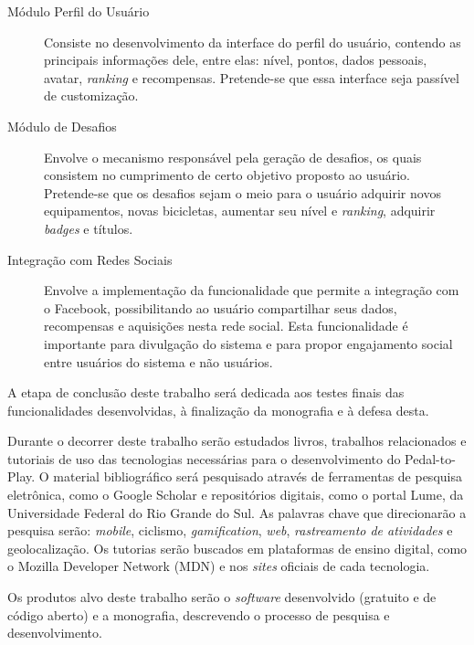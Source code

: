 \begin{description}
\item[Módulo Perfil do Usuário] Consiste no desenvolvimento da interface do perfil do usuário, contendo as principais informações dele, entre elas: nível, pontos, dados pessoais, avatar, \textit{ranking} e recompensas. Pretende-se que essa interface seja passível de customização.

\item[Módulo de Desafios] Envolve o mecanismo responsável pela geração de desafios, os quais consistem no cumprimento de certo objetivo proposto ao usuário. Pretende-se que os desafios sejam o meio para o usuário adquirir novos equipamentos, novas bicicletas, aumentar seu nível e \textit{ranking}, adquirir \textit{badges} e títulos.

\item[Integração com Redes Sociais] Envolve a implementação da funcionalidade que permite a integração com o Facebook, possibilitando ao usuário compartilhar seus dados, recompensas e aquisições nesta rede social. Esta funcionalidade é importante para divulgação do sistema e para propor engajamento social entre usuários do sistema e não usuários.
\end{description}

A etapa de conclusão deste trabalho será dedicada aos testes finais das funcionalidades desenvolvidas, à finalização da monografia e à defesa desta. \par 

Durante o decorrer deste trabalho serão estudados livros, trabalhos relacionados e tutoriais de uso das tecnologias necessárias para o  desenvolvimento do Pedal-to-Play. O material bibliográfico será pesquisado através de ferramentas de pesquisa eletrônica, como o Google Scholar e repositórios digitais, como o portal Lume, da Universidade Federal do Rio Grande do Sul. As palavras chave que direcionarão a pesquisa serão: \textit{mobile}, ciclismo, \textit{gamification}, \textit{web}, \textit{rastreamento de atividades} e geolocalização. Os tutorias serão buscados em plataformas de ensino digital, como o Mozilla Developer Network (MDN) e nos \textit{sites} oficiais de cada tecnologia. \par

Os produtos alvo deste trabalho serão o \textit{software} desenvolvido (gratuito e de código aberto) e a monografia, descrevendo o processo de pesquisa e desenvolvimento. \par
